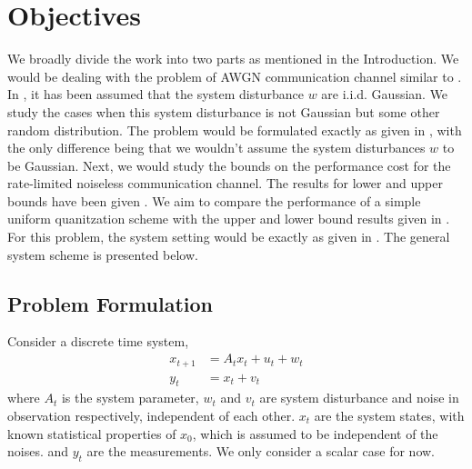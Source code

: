 \documentclass[12pt]{caltech_thesis_progress2}
\begin{document}
\chapter{Objectives}
We broadly divide the work into two parts as mentioned in the Introduction. We would be dealing with the problem of AWGN communication channel similar to \cite{anatoly}. In \cite{anatoly}, it has been assumed that the system disturbance $w$ are i.i.d. Gaussian. We study the cases when this system disturbance is not Gaussian but some other random distribution. The problem would be formulated exactly as given in \cite{anatoly}, with the only difference being that we wouldn't assume the system disturbances $w$ to be Gaussian. Next, we would study the bounds on the performance cost for the rate-limited noiseless communication channel. The results for lower and upper bounds have been given \cite{victoria}. We aim to compare the performance of a simple uniform quanitzation scheme with the upper and lower bound results given in \cite{victoria}. For this problem, the system setting would be exactly as given in \cite{victoria}. The general system scheme is presented below.
%
	\section{Problem Formulation}
	\label{problem}
		Consider a discrete time system,
			\begin{align}
			\label{system}
				x_{t+1}&=A_{t}x_{t} + u_{t} + w_{t}\\
				y_{t}&=x_{t}+v_{t}
			\end{align}
			where $A_{t}$ is the system parameter, $w_{t}$ and $v_{t}$ are system disturbance and noise in observation respectively, independent of each other. $x_{t}$ are the system states, with known statistical properties of $x_{0}$, which is assumed to be independent of the noises. and $y_{t}$ are the measurements. We only consider a scalar case for now.\\
\end{document}
